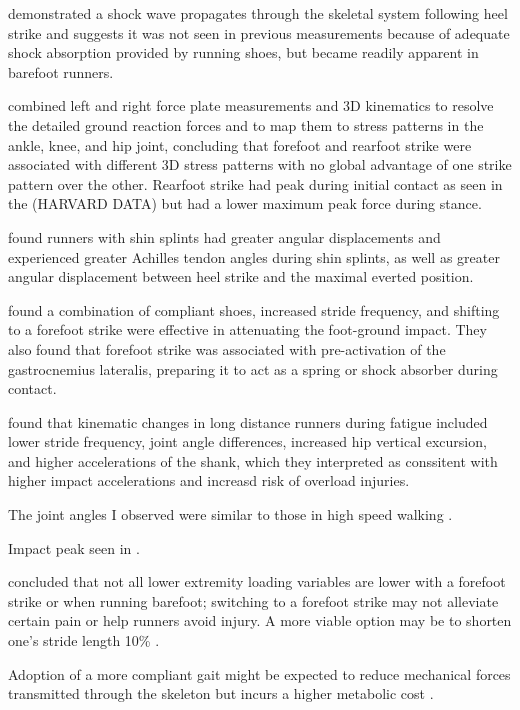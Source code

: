 \citet{dickinson1985measurement} demonstrated a shock wave propagates through the skeletal system following heel strike and suggests it was not seen in previous measurements because of adequate shock absorption provided by running shoes, but became readily apparent in barefoot runners. 

\citet{knorz2017three} combined left and right force plate measurements and 3D kinematics to resolve the detailed ground reaction forces and to map them to stress patterns in the ankle, knee, and hip joint, concluding that forefoot and rearfoot strike were associated with different 3D stress patterns with no global advantage of one strike pattern over the other. Rearfoot strike had peak during initial contact as seen in the (HARVARD DATA) but had a lower maximum peak force during stance.

\citet{viitasalo1983some} found runners with shin splints had greater angular displacements and experienced greater Achilles tendon angles during shin splints, as well as greater angular displacement between heel strike and the maximal everted position. 

\citet{giandolini2013impact} found a combination of compliant shoes, increased stride frequency, and shifting to a forefoot strike were effective in attenuating the foot-ground impact. They also found that forefoot strike was associated with pre-activation of the gastrocnemius lateralis, preparing it to act as a spring or shock absorber during contact. 

\citet{mizrahi2000effect} found that kinematic changes in long distance runners during fatigue included lower stride frequency, joint angle differences, increased hip vertical excursion, and higher accelerations of the shank, which they interpreted as conssitent with higher impact accelerations and increasd risk of overload injuries. 

The joint angles I observed were similar to those in high speed walking \citep{liu2008muscle}. 

Impact peak seen in \citep{chan1994foot, boyer2015rearfoot}.

\citet{boyer2015rearfoot} concluded that not all lower extremity loading variables are lower with a forefoot strike or when running barefoot; switching to a forefoot strike may not alleviate certain pain or help runners avoid injury. A more viable option may be to shorten one’s stride length 10\% \citep{boyer2015rearfoot}.

Adoption of a more compliant gait might be expected to reduce mechanical forces transmitted through the skeleton but incurs a higher metabolic cost \citep{mcmahon1987groucho}. 



